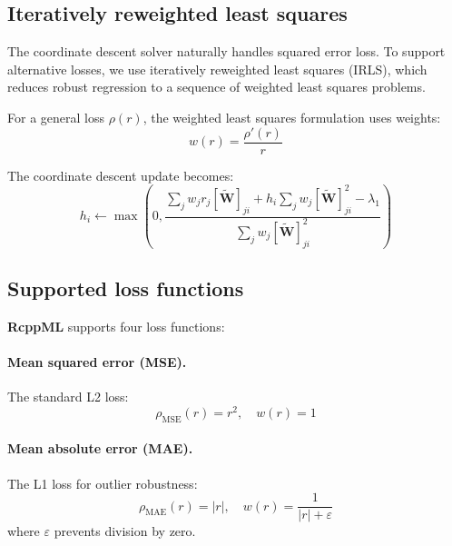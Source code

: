 \documentclass[11pt]{article}
\newcommand{\pkg}[1]{\textbf{#1}}
\begin{document}
\subsection{Iteratively reweighted least squares}

The coordinate descent solver naturally handles squared error loss. To support 
alternative losses, we use iteratively reweighted least squares (IRLS), which 
reduces robust regression to a sequence of weighted least squares problems.

For a general loss $\rho(r)$, the weighted least squares formulation uses 
weights:
\begin{equation}
  w(r) = \frac{\rho'(r)}{r}
  \label{eq:irls_weights}
\end{equation}

The coordinate descent update becomes:
\begin{equation}
  h_i \leftarrow \max\left(0, \frac{\sum_j w_j r_j [\tilde{\mathbf{W}}]_{ji} + 
  h_i \sum_j w_j [\tilde{\mathbf{W}}]_{ji}^2 - \lambda_1}
  {\sum_j w_j [\tilde{\mathbf{W}}]_{ji}^2}\right)
  \label{eq:weighted_cd}
\end{equation}

\subsection{Supported loss functions}

\pkg{RcppML} supports four loss functions:

\paragraph{Mean squared error (MSE).}
The standard L2 loss:
\begin{equation}
  \rho_{\text{MSE}}(r) = r^2, \quad w(r) = 1
  \label{eq:mse}
\end{equation}

\paragraph{Mean absolute error (MAE).}
The L1 loss for outlier robustness:
\begin{equation}
  \rho_{\text{MAE}}(r) = |r|, \quad w(r) = \frac{1}{|r| + \varepsilon}
  \label{eq:mae}
\end{equation}
where $\varepsilon$ prevents division by zero.
\end{document}
